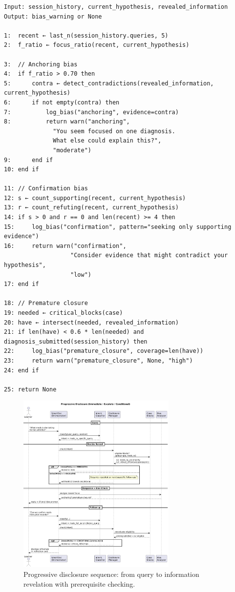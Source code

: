 \begin{verbatim}
Input: session_history, current_hypothesis, revealed_information
Output: bias_warning or None

1:  recent ← last_n(session_history.queries, 5)
2:  f_ratio ← focus_ratio(recent, current_hypothesis)

3:  // Anchoring bias
4:  if f_ratio > 0.70 then
5:      contra ← detect_contradictions(revealed_information, current_hypothesis)
6:      if not empty(contra) then
7:          log_bias("anchoring", evidence=contra)
8:          return warn("anchoring",
              "You seem focused on one diagnosis.
              What else could explain this?",
              "moderate")
9:      end if
10: end if

11: // Confirmation bias
12: s ← count_supporting(recent, current_hypothesis)
13: r ← count_refuting(recent, current_hypothesis)
14: if s > 0 and r == 0 and len(recent) >= 4 then
15:     log_bias("confirmation", pattern="seeking only supporting evidence")
16:     return warn("confirmation",
                   "Consider evidence that might contradict your hypothesis",
                   "low")
17: end if

18: // Premature closure
19: needed ← critical_blocks(case)
20: have ← intersect(needed, revealed_information)
21: if len(have) < 0.6 * len(needed) and diagnosis_submitted(session_history) then
22:     log_bias("premature_closure", coverage=len(have))
23:     return warn("premature_closure", None, "high")
24: end if

25: return None
\end{verbatim}

\begin{figure}[h]
\centering
\includegraphics[width=0.70\textwidth]{figures/diagrams/progressive-disclosure.png}
\caption{Progressive disclosure sequence: from query to information revelation with prerequisite checking.}
\label{fig:progressive-disclosure}
\end{figure}

